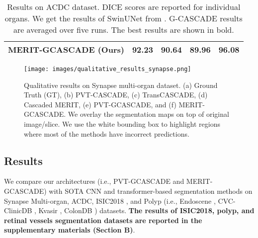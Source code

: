 \documentclass[10pt,twocolumn,letterpaper]{article}
\begin{document}
\begin{table}[]
\begin{center}
\begin{adjustbox}{width=0.48\textwidth}
\begin{tabular}{lrrrr}
MERIT-GCASCADE (\textbf{Ours})    & \textbf{92.23}                        & \textbf{90.64}                  & \textbf{89.96}                   & \textbf{96.08} \\
\bottomrule \end{tabular}
\end{adjustbox}
\end{center}
\caption{Results on ACDC dataset. DICE scores are reported for individual organs. We get the results of SwinUNet from \cite{Rahman_2023_WACV}. G-CASCADE results are averaged over five runs. The best results are shown in bold.} \label{tab:acdc_results}
\end{table}

\begin{figure*}[t]
\begin{center}
\texttt{[image: images/qualitative\_results\_synapse.png]}
\end{center}
   \caption{Qualitative results on Synapse multi-organ dataset. (a) Ground Truth (GT), (b) PVT-CASCADE, (c) TransCASCADE, (d) Cascaded MERIT, (e) PVT-GCASCADE, and (f) MERIT-GCASCADE. We overlay the segmentation maps on top of original image/slice. We use the white bounding box to highlight regions where most of the methods have incorrect predictions.}
\label{fig:qualitative_synapse}
\end{figure*}

\subsection{Results}
\label{ssec:results}
We compare our architectures (i.e., PVT-GCASCADE and MERIT-GCASCADE) with SOTA CNN and transformer-based segmentation methods
on Synapse Multi-organ, ACDC, ISIC2018 \cite{codella2019skin}, and Polyp (i.e., Endoscene  \cite{vazquez2017benchmark}, CVC-ClinicDB \cite{bernal2015wm}, Kvasir \cite{jha2020kvasir}, ColonDB \cite{tajbakhsh2015automated}) datasets. \textbf{The results of ISIC2018, polyp, \color{black}and retinal vessels segmentation \color{black}datasets are reported in the supplementary materials (Section B)}.
\end{document}
